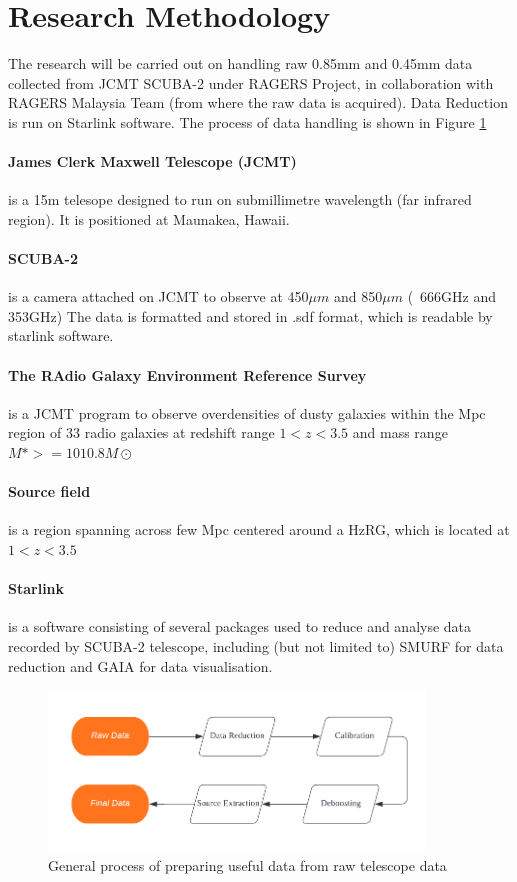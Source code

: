 \documentclass{article}
\begin{document}
\section{Research Methodology}

The research will be carried out on handling raw 0.85mm and 0.45mm data collected from JCMT SCUBA-2 under RAGERS Project, in collaboration with RAGERS Malaysia Team (from where the raw data is acquired). Data Reduction is run on Starlink software. The process of data handling is shown in Figure \ref{fig:flowchart1}

\paragraph{James Clerk Maxwell Telescope (JCMT)} is a 15m telesope designed to run on submillimetre wavelength (far infrared region). It is positioned at Maunakea, Hawaii.

\paragraph{SCUBA-2} is a camera attached on JCMT to observe at 450$\mu m$ and 850$\mu m$ (~666GHz and 353GHz) The data is formatted and stored in .sdf format, which is readable by starlink software.

\paragraph{The RAdio Galaxy Environment Reference Survey} is a JCMT program to observe overdensities of dusty galaxies within the Mpc region of 33 radio galaxies at redshift range $1 < z < 3.5$ and mass range $M\ast >=1010.8M\odot $ 

\paragraph{Source field} is a region spanning across few Mpc centered around a HzRG, which is located at $1 < z < 3.5$ 

\paragraph{Starlink} is a software consisting of several packages used to reduce and analyse data recorded by SCUBA-2 telescope, including (but not limited to) SMURF for data reduction and GAIA for data visualisation.

\begin{figure}
    \centering
    \includegraphics[width=100mm]{Flowchart.png}
    \caption{General process of preparing useful data from raw telescope data}
    \label{fig:flowchart1}
\end{figure}
\end{document}
